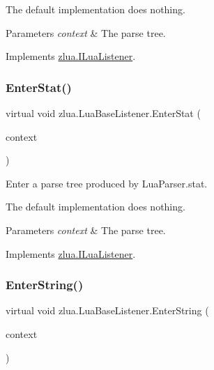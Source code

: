 The default implementation does nothing.


\begin{DoxyParams}{Parameters}
{\em context} & The parse tree.\\
\hline
\end{DoxyParams}


Implements \mbox{\hyperlink{interfacezlua_1_1_i_lua_listener_a0035b00baa60225e9b546903bf41835e}{zlua.\+I\+Lua\+Listener}}.

\mbox{\label{classzlua_1_1_lua_base_listener_a863cb95dc744fd28f9194958e1d42341}} 
\subsubsection{\texorpdfstring{Enter\+Stat()}{EnterStat()}}
{\footnotesize\ttfamily virtual void zlua.\+Lua\+Base\+Listener.\+Enter\+Stat (\begin{DoxyParamCaption}\item[{\mbox{[}\+Not\+Null\mbox{]} \mbox{\hyperlink{classzlua_1_1_lua_parser_1_1_stat_context}{Lua\+Parser.\+Stat\+Context}}}]{context }\end{DoxyParamCaption})\hspace{0.3cm}{\ttfamily [virtual]}}



Enter a parse tree produced by Lua\+Parser.\+stat. 

The default implementation does nothing.


\begin{DoxyParams}{Parameters}
{\em context} & The parse tree.\\
\hline
\end{DoxyParams}


Implements \mbox{\hyperlink{interfacezlua_1_1_i_lua_listener_a4d0313123030b6de6c2e4b63a00bb66f}{zlua.\+I\+Lua\+Listener}}.

\mbox{\label{classzlua_1_1_lua_base_listener_a98b2e77fa39477251ef47c023d51d559}} 
\subsubsection{\texorpdfstring{Enter\+String()}{EnterString()}}
{\footnotesize\ttfamily virtual void zlua.\+Lua\+Base\+Listener.\+Enter\+String (\begin{DoxyParamCaption}\item[{\mbox{[}\+Not\+Null\mbox{]} \mbox{\hyperlink{classzlua_1_1_lua_parser_1_1_string_context}{Lua\+Parser.\+String\+Context}}}]{context }\end{DoxyParamCaption})\hspace{0.3cm}{\ttfamily [virtual]}}



